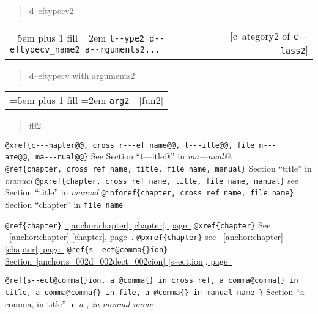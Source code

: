 \documentclass{book}
\begin{document}
\begin{titlepage}
%
\begin{quote}
\unskip{\parskip=0pt\noindent}%
d--eftypecv2
\end{quote}


\noindent\begin{tabularx}{\linewidth}{@{}Xr}
\rightskip=5em plus 1 fill
\hangindent=2em
\texttt{t{-}{-}ype2 d{-}{-}eftypecv\_name2 a{-}{-}rguments2...}& [c--ategory2 of \texttt{c{-}{-}lass2}]
\end{tabularx}

%
\begin{quote}
\unskip{\parskip=0pt\noindent}%
d--eftypecv with arguments2
\end{quote}


\noindent\begin{tabularx}{\linewidth}{@{}Xr}
\rightskip=5em plus 1 fill
\hangindent=2em
\texttt{arg2}& [fun2]
\end{tabularx}

%
\begin{quote}
\unskip{\parskip=0pt\noindent}%
fff2
\end{quote}


\texttt{@xref\{c{-}{-}{-}hapter@@,\ cross r{-}{-}{-}ef name@@,\ t{-}{-}{-}itle@@,\ file n{-}{-}{-}ame@@,\ ma{-}{-}{-}nual@@\}} See Section ``t---itle@'' in \textsl{ma---nual@}.
\texttt{@ref\{chapter,\ cross ref name,\ title,\ file name,\ manual\}} Section ``title'' in \textsl{manual}
\texttt{@pxref\{chapter,\ cross ref name,\ title,\ file name,\ manual\}} see Section ``title'' in \textsl{manual}
\texttt{@inforef\{chapter,\ cross ref name,\ file name\}} Section ``chapter'' in \texttt{file name}

\texttt{@ref\{chapter\}} \hyperref[anchor:chapter]{\chaptername~\ref*{anchor:chapter} [chapter], page~\pageref*{anchor:chapter}}
\texttt{@xref\{chapter\}} See \hyperref[anchor:chapter]{\chaptername~\ref*{anchor:chapter} [chapter], page~\pageref*{anchor:chapter}}.
\texttt{@pxref\{chapter\}} see \hyperref[anchor:chapter]{\chaptername~\ref*{anchor:chapter} [chapter], page~\pageref*{anchor:chapter}}
\texttt{@ref\{s{-}{-}ect@comma\{\}ion\}} \hyperref[anchor:s_002d_002dect_002cion]{Section~\ref*{anchor:s_002d_002dect_002cion} [s--ect,ion], page~\pageref*{anchor:s_002d_002dect_002cion}}

\texttt{@ref\{s{-}{-}ect@comma\{\}ion,\ a @comma\{\}\ in cross
ref,\ a comma@comma\{\}\ in title,\ a comma@comma\{\}\ in file,\ a @comma\{\}\ in manual name \}}
Section ``a comma, in title'' in \textsl{a , in manual name}


\end{titlepage}
\end{document}
